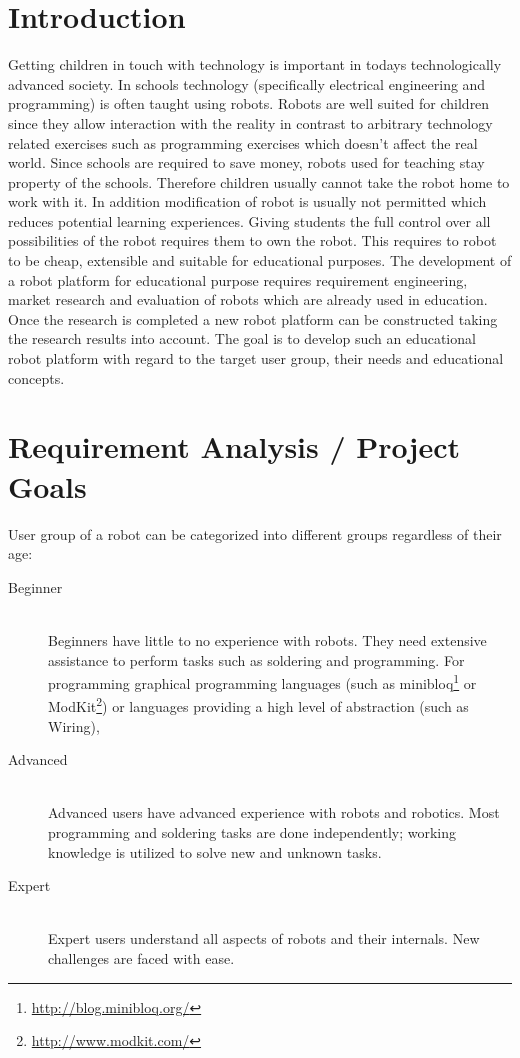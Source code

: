 \chapter{Introduction}
Getting children in touch with technology is important in todays technologically advanced society. In schools technology (specifically electrical engineering and programming) is often taught using robots. Robots are well suited for children since they allow interaction with the reality in contrast to arbitrary technology related exercises such as programming exercises which doesn't affect the real world.\cite[pp.16]{johnson2003children}\newline 
Since schools are required to save money, robots used for teaching stay property of the schools. Therefore children usually cannot take the robot home to work with it. In addition modification of robot is usually not permitted which reduces potential learning experiences. Giving students the full control over all possibilities of the robot requires them to own the robot. This requires to robot to be cheap, extensible and suitable for educational purposes.\newline
The development of a robot platform for educational purpose requires requirement engineering, market research and evaluation of robots which are already used in education. Once the research is completed a new robot platform can be constructed taking the research results into account. The goal is to develop such an educational robot platform with regard to the target user group, their needs and educational concepts.
\chapter{Requirement Analysis / Project Goals}
User group of a robot can be categorized into different groups regardless of their age\cite{enderle2009grape}:
\begin{description}
\item[Beginner] \hfill \\ Beginners have little to no experience with robots. They need extensive assistance to perform tasks such as soldering and programming. For programming graphical programming languages (such as minibloq\footnote{\url{http://blog.minibloq.org/}} or ModKit\footnote{\url{http://www.modkit.com/}}) or languages providing a high level of abstraction (such as Wiring), 
\item[Advanced] \hfill \\ Advanced users have advanced experience with robots and robotics. Most programming and soldering tasks are done independently; working knowledge is utilized to solve new and unknown tasks.  
\item[Expert] \hfill \\ Expert users understand all aspects of robots and their internals. New challenges are faced with ease.
\end{description}

